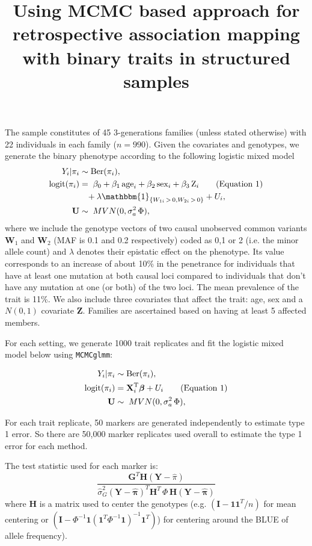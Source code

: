\documentclass[11pt,a4paper,english]{article}
\title{Using MCMC based approach for retrospective association mapping with binary traits in structured samples}
\date{\vspace{-7ex}}
\newcommand\numberthis{\stepcounter{equation}{}\tag{Equation \theequation}}
\begin{document}
\maketitle

The sample constitutes of 45 3-generations families (unless stated otherwise) with 22 individuals in each family ($n=990$). Given the covariates and genotypes, we generate the binary phenotype according to the following logistic mixed model
\begin{align*}
Y_i|\pi_i &\sim \text{Ber}(\pi_i),\\
\text{logit}(\pi_i) &=  \;\beta_0 + \beta_1\, \text{age}_i + \beta_2\, \text{sex}_i + \beta_3\, \text{Z}_i \numberthis\\
&\;\;\; +\lambda \mathbbm{1}_{\{W_{1i}\,>\,0,W_{2i}\,>\,0\}} + U_i,\\
 \mathbf{U} &\sim \; MVN(0, \sigma_a^2\, \Phi),
\end{align*}
where we include the genotype vectors of two causal unobserved common variants $\mathbf{W}_1$ and $\mathbf{W}_2$ (MAF is 0.1 and 0.2 respectively) coded as 0,1 or 2 (i.e. the minor allele count) and $\lambda$ denotes their epistatic effect on the phenotype. Its value corresponds to an increase of about 10\% in the penetrance for individuals that have at least one mutation at both causal loci compared to individuals that don't have any mutation at one (or both) of the two loci. The mean prevalence of the trait is 11\%. We also include three covariates that affect the trait: age, sex and a $N(0,1)$ covariate $\mathbf{Z}$. Families are ascertained based on having at least 5 affected members.

For each setting, we generate 1000 trait replicates and fit the logistic mixed model below using \verb+MCMCglmm+:

\vspace{-5ex}
\begin{align*}
Y_i|\pi_i &\sim \text{Ber}(\pi_i),\\
\text{logit}(\pi_i) &= \textbf{X}_i^\mathrm{T}\boldsymbol{\beta} + U_i\numberthis\\
\mathbf{U} &\sim \; MVN(0, \sigma_a^2\, \Phi),
\end{align*}

\vspace{-1.3ex}
For each trait replicate, 50 markers are generated independently to estimate type 1 error. So there are 50,000 marker replicates used overall to estimate the type 1 error for each method.

The test statistic used for each marker is:
\[
\frac{\mathbf{G}^T\mathbf{H}(\mathbf{Y}-\hat{\pi})}{\hat{\sigma}_G^2 (\mathbf{Y}-\hat{\mathbf{\pi}})^T\mathbf{H}^T\,\Phi \,\mathbf{H}(\mathbf{Y}-\hat{\mathbf{\pi}})}
\]
where $\mathbf{H}$ is a matrix used to center the genotypes (e.g. $(\mathbf{I} - \mathbf{1}\mathbf{1}^T/n)$ for mean centering or $(\mathbf{I} - \Phi^{-1}\mathbf{1}(\mathbf{1}^T\Phi^{-1}\mathbf{1})^{-1}\mathbf{1}^T)$) for centering around the BLUE of allele frequency).
\end{document}

